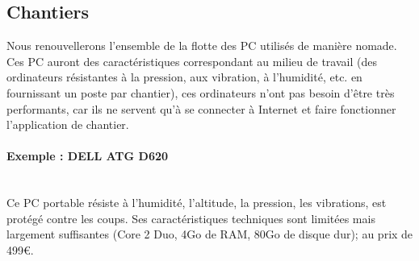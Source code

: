 \subsection{Chantiers}

Nous renouvellerons l'ensemble de la flotte des PC utilisés de manière nomade.
Ces PC auront des caractéristiques correspondant au milieu de
travail (des ordinateurs résistantes à la pression, aux vibration, à
l'humidité, etc.  en fournissant un poste par chantier), ces ordinateurs
n'ont pas besoin d’être très performants, car ils ne servent qu'à se
connecter à Internet et faire fonctionner l'application de chantier.

\paragraph{Exemple : DELL ATG D620}\hfill\\
Ce PC portable résiste à l'humidité, l'altitude,
la pression, les vibrations, est protégé contre les coups.
Ses caractéristiques techniques sont limitées mais largement suffisantes
(Core 2 Duo, 4Go de RAM, 80Go de disque dur); au prix de 499€.

